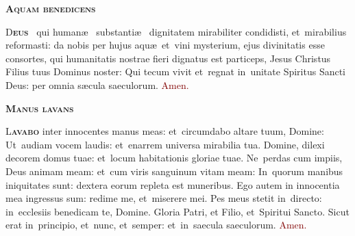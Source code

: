 \documentclass[12pt,a4paper]{scrartcl}
\newcommand{\krzyz}{\textcolor{red}{\raisebox{-1mm}{\scalebox{1.5}{\ding{64}}}}}
\begin{document}
\thispagestyle{empty}

\pagecolor{fondpaille}
\color{darkgreen}

\begin{center}

    \begin{minipage}{0.7\linewidth}

        \vspace*{2.7cm}

        \begin{center}
            \scshape\bfseries\Huge
            Aquam benedicens
        \end{center}

        \vspace*{0.1cm}

        \LARGE\justify

        \lettrine[lines=3]{\color{Maroon}D}{\bfseries\color{Maroon}eus}
        \krzyz~qui human\ae~ substanti\ae~ dignitatem mirabiliter condidisti,
        et~mirabilius reformasti: da nobis per hujus aqu\ae~et~vini mysterium,
        ejus divinitatis esse consortes, qui humanitatis nostrae fieri dignatus
        est particeps, Jesus Christus Filius tuus Dominus noster: Qui tecum
        vivit et~regnat in~unitate Spiritus Sancti Deus: per omnia s\ae cula
        saeculorum. \textcolor{Maroon}{Amen.}\\

        \vspace*{0.1cm}

        \centerline{
            \scshape\bfseries\Huge
            Manus lavans}

        \vspace*{0.1cm}

        \LARGE\justify

        \lettrine[lines=3]{\color{Maroon}L}{\bfseries\color{Maroon}avabo} inter
        innocentes manus meas: et~circumdabo altare tuum, Domine: Ut~audiam
        vocem laudis: et~enarrem universa mirabilia tua. Domine, dilexi decorem
        domus tuae: et~locum habitationis gloriae tuae. Ne~perdas cum impiis,
        Deus animam meam: et~cum viris sanguinum vitam meam: In~quorum manibus
        iniquitates sunt: dextera eorum repleta est muneribus. Ego autem in
        innocentia mea ingressus sum: redime me, et~miserere mei. Pes meus
        stetit in~directo: in~ecclesiis benedicam te, Domine. Gloria Patri, et
        Filio, et~Spiritui Sancto. Sicut erat in~principio, et~nunc, et~semper:
        et~in~saecula saeculorum. \textcolor{Maroon}{Amen.}
    \end{minipage}
\end{center}

\vspace*{1cm}
\end{document}
